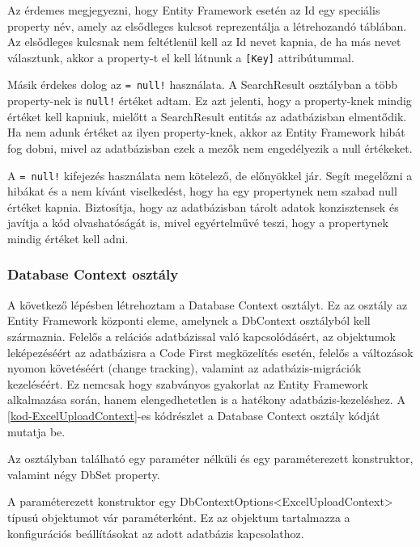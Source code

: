 \documentclass[
]{thesis-ekf}
\theoremstyle{definition}
\theoremstyle{remark}
\begin{document}
	
Az érdemes megjegyezni, hogy Entity Framework esetén az Id egy speciális property név, amely az elsődleges kulcsot reprezentálja a létrehozandó táblában. Az elsődleges kulcsnak nem feltétlenül kell az Id nevet kapnia, de ha más nevet választunk, akkor a property-t el kell látnunk a \texttt{[Key]} attribútummal.

Másik érdekes dolog az \texttt{= null!} használata. A SearchResult osztályban a több property-nek is \texttt{null!} értéket adtam. Ez azt jelenti, hogy a property-knek mindig értéket kell kapniuk, mielőtt a SearchResult entitás az adatbázisban elmentődik. Ha nem adunk értéket az ilyen property-knek, akkor az Entity Framework hibát fog dobni, mivel az adatbázisban ezek a mezők nem engedélyezik a null értékeket.

A \texttt{= null!} kifejezés használata nem kötelező, de előnyökkel jár. Segít megelőzni a hibákat és a nem kívánt viselkedést, hogy ha egy propertynek nem szabad null értéket kapnia. Biztosítja, hogy az adatbázisban tárolt adatok konzisztensek és javítja a kód olvashatóságát is, mivel egyértelművé teszi, hogy a propertynek mindig értéket kell adni.

\subsubsection{Database Context osztály}
A következő lépésben létrehoztam a Database Context osztályt. Ez az osztály az Entity Framework központi eleme, amelynek a DbContext osztályból kell származnia. Felelős a relációs adatbázissal való kapcsolódásért, az objektumok leképezéséért az adatbázisra a Code First megközelítés esetén, felelős a változások nyomon követéséért (change tracking), valamint az adatbázis-migrációk kezeléséért. Ez nemcsak hogy szabványos gyakorlat az Entity Framework alkalmazása során, hanem elengedhetetlen is a hatékony adatbázis-kezeléshez. A \ref{kod-ExcelUploadContext}-es kódrészlet a  Database Context osztály kódját mutatja be.


Az osztályban található egy paraméter nélküli és egy paraméterezett konstruktor, valamint négy DbSet property. 

A paraméterezett konstruktor egy DbContextOptions<ExcelUploadContext> típusú objektumot vár paraméterként. Ez az objektum tartalmazza a konfigurációs beállításokat az adott adatbázis kapcsolathoz.
\end{document}
